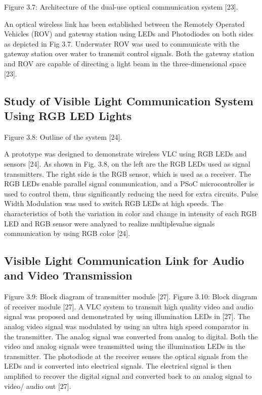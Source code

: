 Figure 3.7: Architecture of the dual-use optical communication system [23].

An optical wireless link has been established between the Remotely Operated Vehicles
(ROV) and gateway station using LEDs and Photodiodes on both sides as depicted in Fig
3.7. Underwater ROV was used to communicate with the gateway station over water to
transmit control signals. Both the gateway station and ROV are capable of directing a
light beam in the three-dimensional space [23]. 


\subsection{Study of Visible Light Communication System Using RGB LED Lights}

Figure 3.8: Outline of the system [24].

A prototype was designed to demonstrate wireless VLC using RGB LEDs and sensors
[24]. As shown in Fig. 3.8, on the left are the RGB LEDs used as signal transmitters. The
right side is the RGB sensor, which is used as a receiver. The RGB LEDs enable parallel
signal communication, and a PSoC microcontroller is used to control them, thus
significantly reducing the need for extra circuits. Pulse Width Modulation was used to
switch RGB LEDs at high speeds. The characteristics of both the variation in color and
change in intensity of each RGB LED and RGB sensor were analyzed to realize multiplevalue
signals communication by using RGB color [24]. 

\subsection{Visible Light Communication Link for Audio and Video Transmission}

Figure 3.9: Block diagram of transmitter module [27].
Figure 3.10: Block diagram of receiver module [27].
A VLC system to transmit high quality video and audio signal was proposed and
demonstrated by using illumination LEDs in [27]. The analog video signal was
modulated by using an ultra high speed comparator in the transmitter. The analog signal
was converted from analog to digital. Both the video and analog signals were transmitted
using the illumination LEDs in the transmitter. The photodiode at the receiver senses the
optical signals from the LEDs and is converted into electrical signals. The electrical
signal is then amplified to recover the digital signal and converted back to an analog
signal to video/ audio out [27]. 

